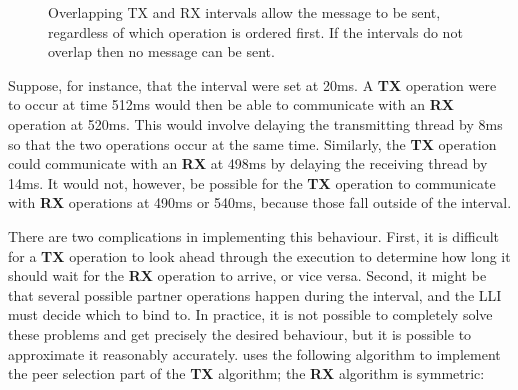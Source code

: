 \begin{figure}
{
    \label{fig:enforce:message_windows:failed}
  }
  \caption{Overlapping TX and RX intervals allow the message to be
    sent, regardless of which operation is ordered first.  If the
    intervals do not overlap then no message can be sent. }
  \label{fig:enforce:message_windows}
\end{figure}

Suppose, for instance, that the interval were set at 20ms.  A
\textbf{TX} operation were to occur at time 512ms would then be able
to communicate with an \textbf{RX} operation at 520ms.  This would
involve delaying the transmitting thread by 8ms so that the two
operations occur at the same time.  Similarly, the \textbf{TX}
operation could communicate with an \textbf{RX} at 498ms by delaying
the receiving thread by 14ms.  It would not, however, be possible for
the \textbf{TX} operation to communicate with \textbf{RX} operations
at 490ms or 540ms, because those fall outside of the interval.

There are two complications in implementing this behaviour.  First, it
is difficult for a \textbf{TX} operation to look ahead through the
execution to determine how long it should wait for the \textbf{RX}
operation to arrive, or vice versa.  Second, it might be that several
possible partner operations happen during the interval, and the LLI
must decide which to bind to.  In practice, it is not possible to
completely solve these problems and get precisely the desired
behaviour, but it is possible to approximate it reasonably accurately.
{\Implementation} uses the following algorithm to implement the peer
selection part of the \textbf{TX} algorithm; the \textbf{RX} algorithm
is symmetric:

